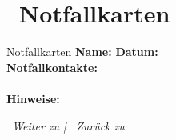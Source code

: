 \section*{\textcolor{ctmmBlue}{\faHeartbeat{}~Notfallkarten}}
\label{sec:notfallkarten}

\begin{ctmmBlueBox}{Notfallkarten}
\textbf{Name:}  \quad \textbf{Datum:} \\
\vspace{0.5cm}
\textbf{Notfallkontakte:}\\
\\
\vspace{0.5cm}
\textbf{Hinweise:}\\
\end{ctmmBlueBox}

\vspace{1cm}
\begin{center}
\textit{\textcolor{ctmmGreen}{\faChevronRight~Weiter zu}  | \textcolor{ctmmBlue}{\faChevronLeft~Zurück zu} }
\end{center}
